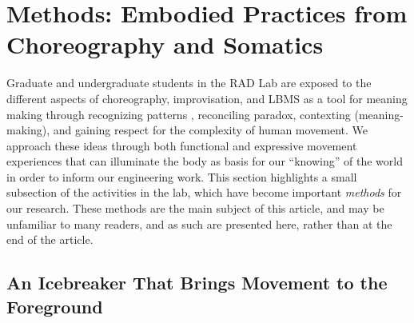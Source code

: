\documentclass[arts,article,submit,moreauthors,pdftex,10pt,a4paper]{mdpi}
\begin{document}
\section{Methods: Embodied Practices from Choreography and Somatics}


%

Graduate and undergraduate students in the RAD Lab are exposed to the different aspects of choreography, improvisation, and LBMS as a tool for meaning making through recognizing patterns , reconciling paradox, contexting (meaning-making), and gaining respect for the complexity of human movement.  We approach these ideas through both functional and expressive movement experiences that can illuminate the body as basis for our ``knowing'' of the world in order to inform our engineering work.  This section highlights a small subsection of the activities in the lab, which have become important \textit{methods} for our research.  These methods are the main subject of this article, and may be unfamiliar to many readers, and as such are presented here, rather than at the end of the article.  %

\subsection{An Icebreaker That Brings Movement to the Foreground}
\end{document}
